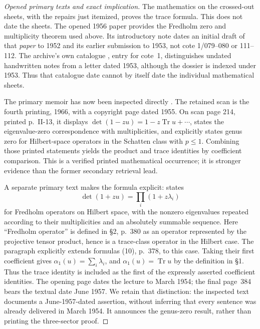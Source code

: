 \begin{proof}[Opened primary texts and exact implication]
The mathematics on the crossed-out sheets, with the repairs just itemized,
proves the trace formula. This does not date the sheets. The opened 1956
paper provides the Fredholm zero and multiplicity theorem used above. Its
introductory note dates an initial draft of that \emph{paper} to 1952 and
its earlier submission to 1953, not cote 1/079--080 or 111--112.
The archive's own catalogue \cite{geoMontpellierCatalogue}, entry for
cote~1, distinguishes undated handwritten notes from a letter dated 1953,
although the dossier is indexed under 1953. Thus that catalogue date
cannot by itself date the individual mathematical sheets.

The primary memoir has now been inspected directly
\cite[Chapter II, \S1, no.~4, printed p.~13]{Grothendieck1955Memoir}.
The retained scan is the fourth printing, 1966, with a copyright page dated
1955. On scan page 214, printed p.~II-13, it displays
$\det(1-zu)=1-z\operatorname{Tr}u+\cdots$, states the eigenvalue-zero
correspondence with multiplicities, and explicitly states genus zero for
Hilbert-space operators in the Schatten class with $p\leq1$. Combining
those printed statements yields the product and trace identities by
coefficient comparison. This is a verified printed mathematical occurrence;
it is stronger evidence than the former secondary retrieval lead.

A separate primary text makes the formula explicit:
\cite[\S4(c), printed p.~383, formula (24)]{GrothendieckBourbaki91} states
\[
 \det(1+zu)=\prod_i(1+z\lambda_i)
\]
for Fredholm operators on Hilbert space, with the nonzero eigenvalues
repeated according to their multiplicities and an absolutely summable
sequence. Here ``Fredholm operator'' is defined in \S2, p.~380 as an
operator represented by the projective tensor product, hence is a
trace-class operator in the Hilbert case. The paragraph explicitly extends
formulas (10), p.~378, to this case. Taking their first coefficient gives
$\alpha_1(u)=\sum_i\lambda_i$, and $\alpha_1(u)=\operatorname{Tr}u$
by the definition in \S1. Thus the trace identity is included as the
first of the expressly asserted coefficient identities.
The opening page dates the lecture to March 1954; the final page~384
bears the textual date June 1957. We retain that distinction: the
inspected text documents a June-1957-dated assertion, without inferring
that every sentence was already delivered in March 1954. It announces
the genus-zero result, rather than printing the three-sector proof.


\end{proof}
